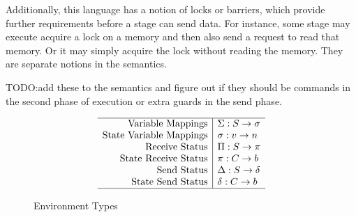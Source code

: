 \documentclass{article}
\begin{document}
Additionally, this language has a notion of locks or barriers,
which provide further requirements before a stage can send data.
For instance, some stage may execute acquire a lock
on a memory and then also send a request to read that memory.
Or it may simply acquire the lock without reading the memory.
They are separate notions in the semantics.

TODO:add these to the semantics and figure out if they should
be commands in the second phase of execution or extra guards in the send phase.

\begin{figure}
  \[\begin{array}{r|l} \hline
    \text{Variable Mappings} & \Sigma: S \rightarrow \sigma \\
    \text{State Variable Mappings} & \sigma: v \rightarrow n \\
    \text{Receive Status} & \Pi: S \rightarrow \pi \\
    \text{State Receive Status} & \pi: C \rightarrow b \\
    \text{Send Status} & \Delta: S \rightarrow \delta \\
    \text{State Send Status} & \delta: C \rightarrow b \\ \hline
  \end{array}\]
  \caption{Environment Types}
\end{figure}
\end{document}

